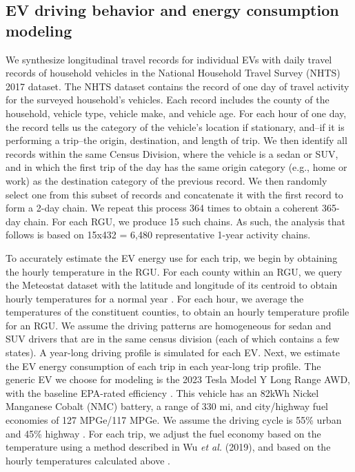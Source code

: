 \documentclass[11pt,preprint]{elsarticle}
\begin{document}
\subsection{EV driving behavior and energy consumption modeling}\label{sec:behavior and energy}
We synthesize longitudinal travel records for individual EVs with daily travel records of household vehicles in the National Household Travel Survey (NHTS) 2017 dataset. The NHTS dataset contains the record of one day of travel activity for the surveyed household's vehicles. Each record includes the county of the household, vehicle type, vehicle make, and vehicle age. For each hour of one day, the record tells us the category of the vehicle's location if stationary, and--if it is performing a trip--the origin, destination, and length of trip. We then identify all records within the same Census Division, where the vehicle is a sedan or SUV, and in which the first trip of the day has the same origin category (e.g., home or work) as the destination category of the previous record. We then randomly select one from this subset of records and concatenate it with the first record to form a 2-day chain. We repeat this process 364 times to obtain a coherent 365-day chain. For each RGU, we produce 15 such chains. As such, the analysis that follows is based on 15x432 = 6,480 representative 1-year activity chains. 

To accurately estimate the EV energy use for each trip, we begin by obtaining the hourly temperature in the RGU. For each county within an RGU, we query the Meteostat dataset with the latitude and longitude of its centroid to obtain hourly temperatures for a normal year \cite{noauthor_weather_2024}. For each hour, we average the temperatures of the constituent counties, to obtain an hourly temperature profile for an RGU. We assume the driving patterns are homogeneous for sedan and SUV drivers that are in the same census division (each of which contains a few states). A year-long driving profile is simulated for each EV. Next, we estimate the EV energy consumption of each trip in each year-long trip profile. The generic EV we choose for modeling is the 2023 Tesla Model Y Long Range AWD, with the baseline EPA-rated efficiency \cite{noauthor_2023_2024-1}. This vehicle has an 82kWh Nickel Manganese Cobalt (NMC) battery, a range of 330 mi, and city/highway fuel economies of 127 MPGe/117 MPGe.  We assume the driving cycle is 55\% urban and 45\% highway \cite{wu_regional_2019}. For each trip, we adjust the fuel economy based on the temperature using a method described in Wu \textit{et al.} (2019), and based on the hourly temperatures calculated above \cite{wu_regional_2019}.
\end{document}
